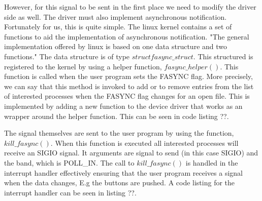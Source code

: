 However, for this signal to be sent in the first place we need to modify the driver side as well. The driver must also implement asynchronous notification. Fortunately for us, this is quite simple. The linux kernel contains a set of functions to aid the implementation of asynchronous notification. "The general implementation offered by linux is based on one data structure and two functions." The data structure is of type $struct fasync\_struct$. This structured  is registered to the kernel by using a helper function, $fasync\_helper()$. This function is called when the user program sets the FASYNC flag. More precisely, we can say that this method is invoked to add or to remove entries from the list of interested processes when the FASYNC flag changes for an open file. This is implemented by adding a new function to the device driver that works as an wrapper around the helper function. This can be seen in code listing ??.

The signal themselves are sent to the user program by using the function, $kill\_fasync()$. When this function is executed all interested processes will receive an SIGIO signal. It arguments are signal to send (in this case SIGIO) and the band, which is POLL\_IN. The call to $kill\_fasync()$ is handled in the interrupt handler effectively ensuring that the user program receives a signal when the data changes, E.g the buttons are pushed. A code listing for the interrupt handler can be seen in listing ??.



 









